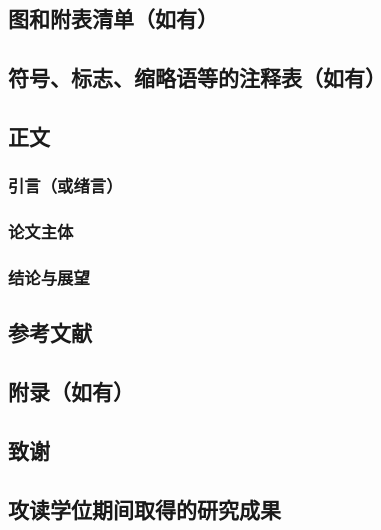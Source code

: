 \subsection{图和附表清单（如有）}
\subsection{符号、标志、缩略语等的注释表（如有）}
\subsection{正文}
\subsubsection{引言（或绪言）}
\subsubsection{论文主体}
\subsubsection{结论与展望}
\subsection{参考文献}
\subsection{附录（如有）}
\subsection{致谢}
\subsection{攻读学位期间取得的研究成果}